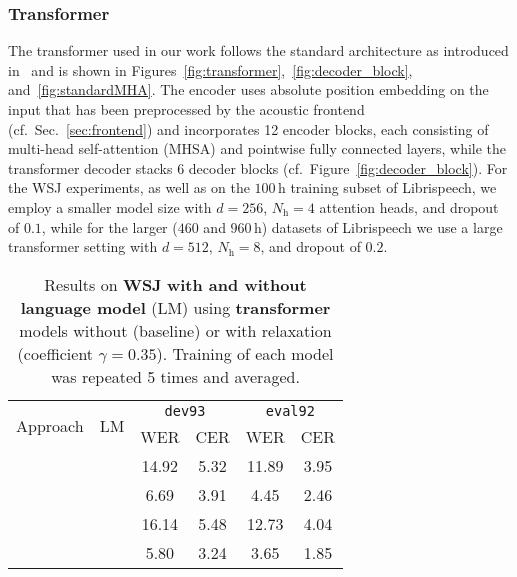\documentclass{article}
\begin{document}
\subsubsection{Transformer}\label{sec:exp_trans}	\vspace{-2.5mm}
The transformer used in our work follows the standard architecture as introduced in~\cite{Vaswani2017} and is shown in Figures~\ref{fig:transformer},~\ref{fig:decoder_block}, and~\ref{fig:standardMHA}. The encoder uses absolute position embedding on the input that has been preprocessed by the acoustic frontend (cf.\ Sec.~\ref{sec:frontend}) and incorporates 12 encoder blocks, each consisting of multi-head self-attention (MHSA) and pointwise fully connected layers, while the transformer decoder stacks 6 decoder blocks (cf.\ Figure~\ref{fig:decoder_block}). For the WSJ experiments, as well as on the $100$\,h training subset of Librispeech, we employ a smaller model size with $d\!=\!256$, $N_\mathrm{h}\!=\!4$ attention heads, and dropout of $0.1$, while for the larger ($460$ and $960$\,h) datasets of Librispeech we use a large transformer setting with $d\!=\!512$, $N_\mathrm{h}\!=\!8$, and dropout of $0.2$. 

\renewcommand{\tabcolsep}{0.2cm}
\begin{table}[t]
	\centering
	\begin{tabular}{@{\hskip 0.1cm} c @{\hskip 0.15cm} c c c c c @{\hskip 0.3cm}  }
		\toprule
		\multirow{2}[4]{*}{Approach} & \multirow{2}[4]{*}{LM} & \multicolumn{2}{c}{\multirow{1}{*}{\tt{dev93}}} & \multicolumn{2}{c}{\multirow{1}{*}{\tt{eval92}}} \\
		
		
		\cmidrule(lr){3-4} \cmidrule(lr){5-6} 
		& 				& WER 			& CER 			& WER 		& CER 			\\
		\midrule
		\multirow{2}[3]{*}{\sf{Baseline}}    		
		& 				& 14.92			& 5.32			& 11.89		& 3.95 \\
		&\checkmark		& 6.69 			& 3.91			& 4.45 		& 2.46 	 		\\
		\midrule
		\multirow{2}[3]{*}{\sf{Relaxed Attention}}			
		&		 		& 16.14			& 5.48 			& 12.73 		& 4.04 	 		\\
		&\checkmark	 	& 5.80 			& 3.24			& 3.65 			& 1.85	 		\\
		\bottomrule
	\end{tabular}	\vspace{-2mm}
	\caption{Results on \textbf{WSJ} \textbf{with and without language model} (LM) using \textbf{transformer} models without (baseline) or with relaxation (coefficient $\gamma\!=\!0.35$). Training of each model was repeated 5 times and averaged.  }
	\label{tab:wsj_nolm}
	\vspace{-4mm}
\end{table}
\vspace{-3mm}
\end{document}
